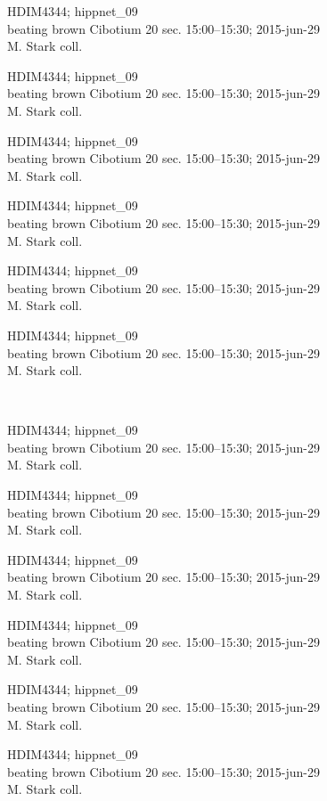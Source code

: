 \documentclass[2pt]{extarticle}
\begin{document}
\noindent
\parbox{0.16\textwidth}{\tiny \raggedright \rule[-0.3\baselineskip]{0pt}{10pt}HDIM4344; hippnet\_09\\ beating brown Cibotium 20 sec. 15:00--15:30; 2015-jun-29\\ M. Stark coll.}
\parbox{0.16\textwidth}{\tiny \raggedright \rule[-0.3\baselineskip]{0pt}{10pt}HDIM4344; hippnet\_09\\ beating brown Cibotium 20 sec. 15:00--15:30; 2015-jun-29\\ M. Stark coll.}
\parbox{0.16\textwidth}{\tiny \raggedright \rule[-0.3\baselineskip]{0pt}{10pt}HDIM4344; hippnet\_09\\ beating brown Cibotium 20 sec. 15:00--15:30; 2015-jun-29\\ M. Stark coll.}
\parbox{0.16\textwidth}{\tiny \raggedright \rule[-0.3\baselineskip]{0pt}{10pt}HDIM4344; hippnet\_09\\ beating brown Cibotium 20 sec. 15:00--15:30; 2015-jun-29\\ M. Stark coll.}
\parbox{0.16\textwidth}{\tiny \raggedright \rule[-0.3\baselineskip]{0pt}{10pt}HDIM4344; hippnet\_09\\ beating brown Cibotium 20 sec. 15:00--15:30; 2015-jun-29\\ M. Stark coll.}
\parbox{0.16\textwidth}{\tiny \raggedright \rule[-0.3\baselineskip]{0pt}{10pt}HDIM4344; hippnet\_09\\ beating brown Cibotium 20 sec. 15:00--15:30; 2015-jun-29\\ M. Stark coll.} \\ 
\vspace{0.001in} 

\noindent
\parbox{0.16\textwidth}{\tiny \raggedright \rule[-0.3\baselineskip]{0pt}{10pt}HDIM4344; hippnet\_09\\ beating brown Cibotium 20 sec. 15:00--15:30; 2015-jun-29\\ M. Stark coll.}
\parbox{0.16\textwidth}{\tiny \raggedright \rule[-0.3\baselineskip]{0pt}{10pt}HDIM4344; hippnet\_09\\ beating brown Cibotium 20 sec. 15:00--15:30; 2015-jun-29\\ M. Stark coll.}
\parbox{0.16\textwidth}{\tiny \raggedright \rule[-0.3\baselineskip]{0pt}{10pt}HDIM4344; hippnet\_09\\ beating brown Cibotium 20 sec. 15:00--15:30; 2015-jun-29\\ M. Stark coll.}
\parbox{0.16\textwidth}{\tiny \raggedright \rule[-0.3\baselineskip]{0pt}{10pt}HDIM4344; hippnet\_09\\ beating brown Cibotium 20 sec. 15:00--15:30; 2015-jun-29\\ M. Stark coll.}
\parbox{0.16\textwidth}{\tiny \raggedright \rule[-0.3\baselineskip]{0pt}{10pt}HDIM4344; hippnet\_09\\ beating brown Cibotium 20 sec. 15:00--15:30; 2015-jun-29\\ M. Stark coll.}
\parbox{0.16\textwidth}{\tiny \raggedright \rule[-0.3\baselineskip]{0pt}{10pt}HDIM4344; hippnet\_09\\ beating brown Cibotium 20 sec. 15:00--15:30; 2015-jun-29\\ M. Stark coll.} \\ 
\vspace{0.001in} 
\end{document}
